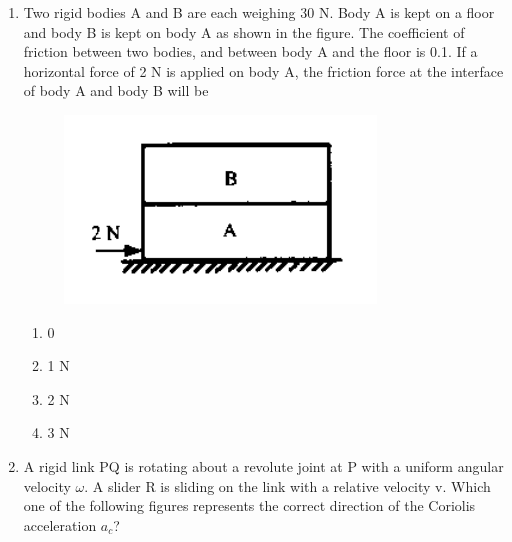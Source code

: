 \documentclass[a4paper,10pt]{article}
\begin{document}
\begin{enumerate}
\item Two rigid bodies A and B are each weighing 30 N. Body A is kept on a floor and body B is kept on body A as shown in the figure. The coefficient of friction between two bodies, and between body A and the floor is 0.1. If a horizontal force of 2 N is applied on body A, the friction force at the interface of body A and body B will be
\begin{figure}[H]
    \centering
    \includegraphics[width=0.3\columnwidth]{Dq3.png}
    \caption*{}
    \label{fig:q3_solid}
\end{figure}
\hfill{}

\begin{multicols}{4}
\begin{enumerate}
\item 0
\item 1 N
\item 2 N
\item 3 N
\end{enumerate}
\end{multicols}

\item A rigid link PQ is rotating about a revolute joint at P with a uniform angular velocity $\omega$. A slider R is sliding on the link with a relative velocity v. Which one of the following figures represents the correct direction of the Coriolis acceleration $a_c$?
\hfill{}


\end{enumerate}
\end{document}

